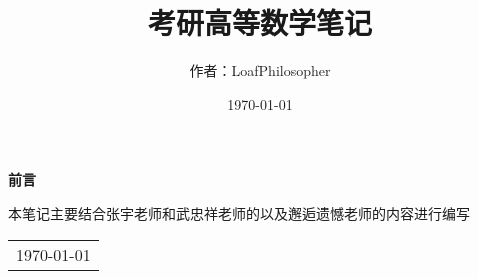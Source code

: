 \title{{\Huge{\textbf{考研高等数学笔记}}}}
\author{作者：LoafPhilosopher }
\date{\today}
\maketitle                   %

\thispagestyle{empty}        %
\begin{center}
	\Huge\textbf{前言}
\end{center}

本笔记主要结合张宇老师和武忠祥老师的以及邂逅遗憾老师的内容进行编写
\begin{flushright}
	\begin{tabular}{c}
		\today \newline 
	\end{tabular}
\end{flushright}

\newpage                      %
\pagestyle{plain}             %
\setcounter{page}{1}          %


\tableofcontents              %
\newpage                      %
\pagestyle{plain}
\setcounter{page}{1}          %
